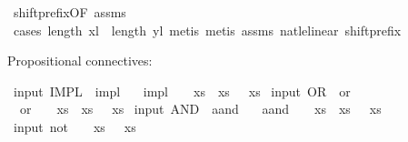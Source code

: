 \begin{isabellebody}
%
\isatagproof
{}\isamarkupfalse%
\ shift{\isacharunderscore}prefix{\isacharbrackleft}OF\ assms{\isacharbrackright}\isanewline
{}\isamarkupfalse%
\ {\isacharparenleft}cases\ {\isachardoublequoteopen}length\ xl\ {\isasymle}\ length\ yl{\isachardoublequoteclose}{\isacharparenright}\ {\isacharparenleft}metis{\isacharcomma}\ metis\ assms\ nat{\isacharunderscore}le{\isacharunderscore}linear\ shift{\isacharunderscore}prefix{\isacharparenright}%
\endisatagproof
{\isafoldproof}%
%
\isadelimproof
%
\endisadelimproof
%
\isadelimdocument
%
\endisadelimdocument
%
\isatagdocument
%
\isamarkuptrue%
%
\endisatagdocument
{\isafolddocument}%
%
\isadelimdocument
%
\endisadelimdocument
%
\begin{isamarkuptext}%
Propositional connectives:%
\end{isamarkuptext}\isamarkuptrue%
\isamarkupfalse%
\ {\isacharparenleft}input{\isacharparenright}\ IMPL\ {\isacharparenleft}\ {\isachardoublequoteopen}impl{\isachardoublequoteclose}\ {}{}{\isacharparenright}\isanewline
{}\ {\isachardoublequoteopen}{\isasymphi}\ impl\ {\isasympsi}\ {\isasymequiv}\ {\isasymlambda}\ xs{\isachardot}\ {\isasymphi}\ xs\ {\isasymlongrightarrow}\ {\isasympsi}\ xs{\isachardoublequoteclose}\isanewline
\isanewline
{}\isamarkupfalse%
\ {\isacharparenleft}input{\isacharparenright}\ OR\ {\isacharparenleft}\ {\isachardoublequoteopen}or{\isachardoublequoteclose}\ {}{}{\isacharparenright}\isanewline
{}\ {\isachardoublequoteopen}{\isasymphi}\ or\ {\isasympsi}\ {\isasymequiv}\ {\isasymlambda}\ xs{\isachardot}\ {\isasymphi}\ xs\ {\isasymor}\ {\isasympsi}\ xs{\isachardoublequoteclose}\isanewline
\isanewline
{}\isamarkupfalse%
\ {\isacharparenleft}input{\isacharparenright}\ AND\ {\isacharparenleft}\ {\isachardoublequoteopen}aand{\isachardoublequoteclose}\ {}{}{\isacharparenright}\isanewline
{}\ {\isachardoublequoteopen}{\isasymphi}\ aand\ {\isasympsi}\ {\isasymequiv}\ {\isasymlambda}\ xs{\isachardot}\ {\isasymphi}\ xs\ {\isasymand}\ {\isasympsi}\ xs{\isachardoublequoteclose}\isanewline
\isanewline
{}\isamarkupfalse%
\ {\isacharparenleft}input{\isacharparenright}\ {\isachardoublequoteopen}not\ {\isasymphi}\ {\isasymequiv}\ {\isasymlambda}\ xs{\isachardot}\ {\isasymnot}\ {\isasymphi}\ xs{\isachardoublequoteclose}\isanewline

\end{isabellebody}

